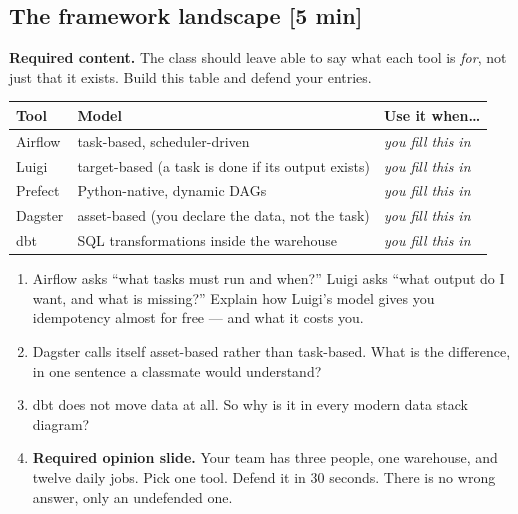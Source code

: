 \documentclass[11pt]{article}
\newcommand{\tm}[1]{\textcolor{grayish}{\small\textsf{[#1]}}}
\begin{document}
\subsection{The framework landscape \tm{5 min}}

\textbf{Required content.} The class should leave able to say what each tool is
\emph{for}, not just that it exists. Build this table and defend your entries.

\begin{center}
\small
\begin{tabular}{@{}llp{}@{}}
\toprule
\textbf{Tool} & \textbf{Model} & \textbf{Use it when\ldots} \\
\midrule
Airflow  & task-based, scheduler-driven & \emph{you fill this in} \\
Luigi    & target-based (a task is done if its output exists) & \emph{you fill this in} \\
Prefect  & Python-native, dynamic DAGs & \emph{you fill this in} \\
Dagster  & asset-based (you declare the data, not the task) & \emph{you fill this in} \\
dbt      & SQL transformations inside the warehouse & \emph{you fill this in} \\
\bottomrule
\end{tabular}
\end{center}

\begin{qbox}
\begin{enumerate}
  \item Airflow asks ``what tasks must run and when?'' Luigi asks ``what output
        do I want, and what is missing?'' Explain how Luigi's model gives you
        idempotency almost for free --- and what it costs you.
  \item Dagster calls itself asset-based rather than task-based. What is the
        difference, in one sentence a classmate would understand?
  \item dbt does not move data at all. So why is it in every modern data stack
        diagram?
  \item \textbf{Required opinion slide.} Your team has three people, one
        warehouse, and twelve daily jobs. Pick one tool. Defend it in 30
        seconds. There is no wrong answer, only an undefended one.
\end{enumerate}
\end{qbox}
\end{document}
